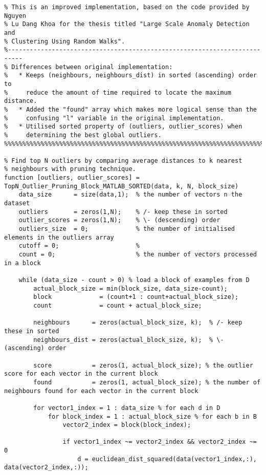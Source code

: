 
\lstset{language=Matlab}
\begin{lstlisting}
% This is an improved implementation, based on the code provided by Nguyen
% Lu Dang Khoa for the thesis titled "Large Scale Anomaly Detection and
% Clustering Using Random Walks".
%--------------------------------------------------------------------------
% Differences between original implementation:
%   * Keeps (neighbours, neighbours_dist) in sorted (ascending) order to
%     reduce the amount of time required to locate the maximum distance.
%   * Added the "found" array which makes more logical sense than the
%     confusing "l" variable in the original implementation.
%   * Utilised sorted property of (outliers, outlier_scores) when
%     determining the best global outliers.
%%%%%%%%%%%%%%%%%%%%%%%%%%%%%%%%%%%%%%%%%%%%%%%%%%%%%%%%%%%%%%%%%%%%%%%%%%%

% Find top N outliers by comparing average distances to k nearest
% neighbours with pruning technique.
function [outliers, outlier_scores] = TopN_Outlier_Pruning_Block_MATLAB_SORTED(data, k, N, block_size)
    data_size      = size(data,1);  % the number of vectors n the dataset
    outliers       = zeros(1,N);    % /- keep these in sorted
    outlier_scores = zeros(1,N);    % \- (descending) order
    outliers_size  = 0;             % the number of initialised elements in the outliers array
    cutoff = 0;                     %
    count = 0;                      % the number of vectors processed in a block

    while (data_size - count > 0) % load a block of examples from D
        actual_block_size = min(block_size, data_size-count);
        block             = (count+1 : count+actual_block_size);
        count             = count + actual_block_size;

        neighbours      = zeros(actual_block_size, k);  % /- keep these in sorted
        neighbours_dist = zeros(actual_block_size, k);  % \- (ascending) order

        score           = zeros(1, actual_block_size); % the outlier score for each vector in the current block
        found           = zeros(1, actual_block_size); % the number of neighbours found for each vector in the current block

        for vector1_index = 1 : data_size % for each d in D
            for block_index = 1 : actual_block_size % for each b in B
                vector2_index = block(block_index);

                if vector1_index ~= vector2_index && vector2_index ~= 0
                    d = euclidean_dist_squared(data(vector1_index,:), data(vector2_index,:));


\end{lstlisting}

